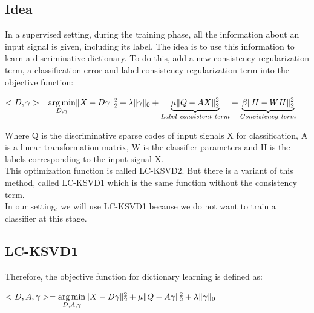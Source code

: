 \subsection{Idea}
In a supervised setting, during the training phase, all the information about an input signal is given, including its label. The idea is to use this information to learn a discriminative dictionary. To do this, \cite{6516503} add a new consistency regularization term, a classification error and label consistency regularization term into the objective function:
\begin{center}
 $<D,\gamma> = \underset{D,\gamma}{\operatorname*{arg\,min}} \|X - D\gamma\|^2_2 + \lambda \|\gamma\|_0 +\underset{Label\ consistent\ term}{\underbrace{\mu \|Q -AX\|_2^2 }} + \underset{Consistency\ term}{\underbrace{\beta\|H-WH\|_2^2}}$
\end{center}
Where Q is the discriminative sparse codes of input signals X for classification, A is a linear transformation matrix, W is the classifier parameters and H is the labels corresponding to the input signal X.\\
This optimization function is called LC-KSVD2. But there is a variant of this method, called LC-KSVD1 which is the same function without the consistency term.\\
In our setting, we will use LC-KSVD1 because we do not want to train a classifier at this stage.
\subsection{LC-KSVD1}
Therefore, the objective function for dictionary learning is  defined as:
\begin{center}
 $<D,A,\gamma> = \underset{D,A,\gamma}{\operatorname*{arg\,min}} \| X - D\gamma \|^2_2 + \mu \|Q -A\gamma\|^2_2 + \lambda\|\gamma\|_0$
\end{center}

